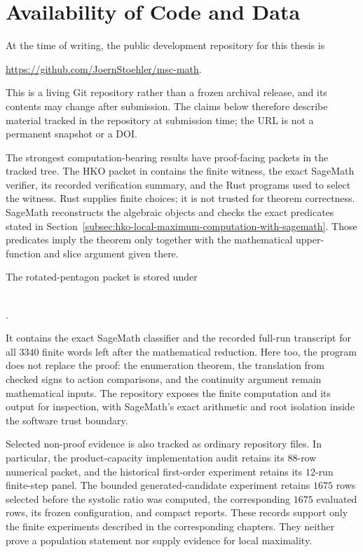 \section{Availability of Code and Data}\label{sec:published-code-data}

At the time of writing, the public development repository for this thesis is
\begin{center}
  \url{https://github.com/JoernStoehler/msc-math}.
\end{center}
This is a living Git repository rather than a frozen archival release, and its
contents may change after submission.  The claims below therefore describe
material tracked in the repository at submission time; the URL is not a
permanent snapshot or a DOI.

The strongest computation-bearing results have proof-facing packets in the
tracked tree.  The HKO packet in
 contains the finite witness, the
exact SageMath verifier, its recorded verification summary, and the Rust
programs used to select the witness.  Rust supplies finite choices; it is not
trusted for theorem correctness.  SageMath reconstructs the algebraic objects
and checks the exact predicates stated in
Section~\ref{subsec:hko-local-maximum-computation-with-sagemath}.  Those
predicates imply the theorem only together with the mathematical
upper-function and slice argument given there.

The rotated-pentagon packet is stored under
\begin{center}
  \small{}\\[-0.2em]
  .
\end{center}
It contains the exact SageMath classifier and the recorded full-run transcript
for all \(3340\) finite words left after the mathematical reduction.  Here too,
the program does not replace the proof: the enumeration theorem, the
translation from checked signs to action comparisons, and the continuity
argument remain mathematical inputs.  The repository exposes the finite
computation and its output for inspection, with SageMath's exact arithmetic
and root isolation inside the software trust boundary.

Selected non-proof evidence is also tracked as ordinary repository files.  In
particular, the product-capacity implementation audit retains its \(88\)-row
numerical packet, and the historical first-order experiment retains its
\(12\)-run finite-step panel.  The bounded generated-candidate experiment
retains \(1675\) rows selected before the systolic ratio was computed, the
corresponding \(1675\) evaluated rows, its frozen configuration, and compact
reports.  These records support only the finite experiments described in the
corresponding chapters.  They neither prove a population statement nor supply
evidence for local maximality.


